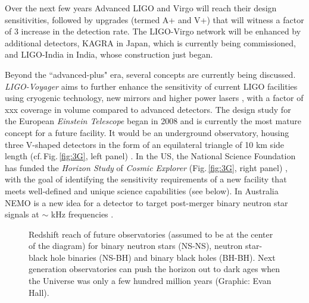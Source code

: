 \documentclass[twocolumn,aps,prd,nofootinbib,superscriptaddress,10pt,notitlepage,preprintnumbers] {revtex4-1}
\begin{document}
Over the next few years Advanced LIGO and Virgo will reach their design sensitivities, followed by upgrades (termed A+ and V+) that will witness a factor of 3 increase in the detection rate. The LIGO-Virgo network will be enhanced by additional detectors, KAGRA in Japan, which is currently being commissioned, and LIGO-India in India, whose construction just began. 

Beyond the ``advanced-plus" era, several concepts are currently being discussed. {\em LIGO-Voyager} aims to further enhance the sensitivity of current LIGO facilities using cryogenic technology, new mirrors and higher power lasers \cite{Adhikari:2019zpy}, with a factor of xxx coverage in volume compared to advanced detectors.  The design study for the European {\em Einstein Telescope} began in 2008 and is currently the most mature concept for a future facility. It would be an underground observatory, housing three V-shaped detectors in the form of an equilateral triangle of 10 km side length (cf.\,Fig.\,\ref{fig:3G}, left panel) \cite{Punturo:2010zz}. In the US, the National Science Foundation has funded the {\em Horizon Study} of {\em Cosmic Explorer} (Fig.\,\ref{fig:3G}, right panel) \cite{CE}, with the goal of identifying the sensitivity requirements of a new facility that meets well-defined and unique science capabilities (see below).  In Australia NEMO is a new idea for a detector to target post-merger binary neutron star signals at $\sim$ kHz frequencies \cite{}. 

\begin{figure}[h]
    \centering
    \caption{Redshift reach of future observatories (assumed to be at the center of the diagram) for binary neutron stars (NS-NS), neutron star-black hole binaries (NS-BH) and binary black holes (BH-BH). Next generation observatories can push the horizon out to dark ages when the Universe was only a few hundred million years (Graphic: Evan Hall).}
    \label{fig:donut}
\end{figure}
\end{document}
